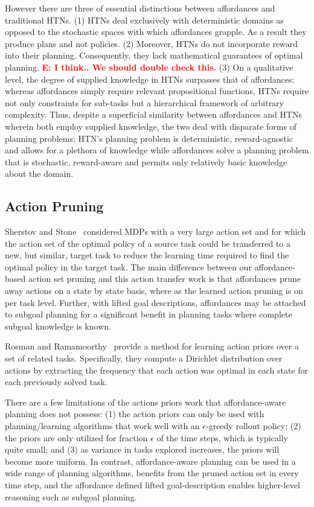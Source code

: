 \documentclass[conference]{IEEEtran}
\newcommand{\enote}[1]{\textcolor{Red}{\textbf{E: #1}}}
\begin{document}
However there are three of essential distinctions between affordances and traditional HTNs. (1) HTNs deal exclusively with deterministic domains as opposed to the stochastic spaces with which affordances grapple. As a result they produce plans and not policies. (2) Moreover, HTNs do not incorporate reward into their planning. Consequently, they lack mathematical guarantees of optimal planning. \enote{I think.. We should double check this.} (3) On a qualitative level, the degree of supplied knowledge in HTNs surpasses that of affordances: whereas affordances simply require relevant propositional functions, HTNs require not only constraints for sub-tasks but a hierarchical framework of arbitrary complexity. Thus, despite a superficial similarity between affordances and HTNs wherein both employ supplied knowledge, the two deal with disparate forms of planning problems; HTN's planning problem is deterministic, reward-agnostic and allows for a plethora of knowledge while affordances solve a planning problem that is stochastic, reward-aware and permits only relatively basic knowledge about the domain.
\subsection{Action Pruning}

Sherstov and Stone~\cite{sherstov2005improving} considered MDPs with a very large action set and for which the action
set of the optimal policy of a source task could be transferred to a new, but similar, target
task to reduce the learning time required to find the optimal policy in the target task. The main difference between our affordance-based action set pruning and this action transfer
work is that affordances prune away actions on a state by state basis, where
as the learned action pruning is on per task level. Further, with lifted goal descriptions, affordances may be attached to subgoal planning for a significant
benefit in planning tasks where complete subgoal knowledge is known.

Rosman and Ramamoorthy~\cite{rosman2012good} provide a method for learning action priors over a set of related tasks. Specifically, they compute a Dirichlet distribution over actions by extracting the frequency that each action was optimal in each state for each previously solved task.

There are a few limitations of the actions priors work that affordance-aware planning does not possess: (1) the action priors can only be used with planning/learning algorithms that work well with an $\epsilon$-greedy rollout policy; (2) the priors are only utilized for fraction $\epsilon$ of the time steps, which is typically quite small; and (3) as variance in tasks explored increases, the priors will become more uniform. In contrast, affordance-aware planning can be used in a wide range of planning algorithms, benefits from the pruned action set in every time step, and the affordance defined lifted goal-description enables higher-level reasoning such as subgoal planning.
\end{document}
